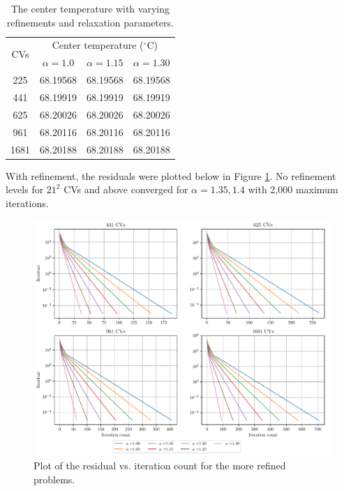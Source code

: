 \documentclass{article}
\begin{document}
\def\arraystretch{1.3}
\begin{table}[H]
	\small
	\centering
	\caption{The center temperature with varying refinements and relaxation parameters.}
	\vspace{0.2cm}
	\begin{tabular}{c|c|c|c}
		\multirow{2}{*}{CVs} & \multicolumn{3}{c}{Center temperature ($^\circ$C)} \\
		\cline{2-4}
		& $\alpha = 1.0$ & $\alpha = 1.15$ & $\alpha = 1.30$ \\     
		\hline
		225  & 68.19568 & 68.19568 & 68.19568 \\
		441  & 68.19919 & 68.19919 & 68.19919 \\
		625  & 68.20026 & 68.20026 & 68.20026 \\
		961  & 68.20116 & 68.20116 & 68.20116 \\
		1681 & 68.20188 & 68.20188 & 68.20188
	\end{tabular}
	\label{table:b-temps}
\end{table}

With refinement, the residuals were plotted below in Figure \ref{fig:b-iterations}. No refinement levels for $21^2$ CVs and above converged for $\alpha = 1.35, 1.4$ with 2,000 maximum iterations.

\begin{figure}[H]
	\centering
	\includegraphics[width=\linewidth]{../results/b-iterations}
	\caption{Plot of the residual vs. iteration count for the more refined problems.}
	\label{fig:b-iterations}
\end{figure}
\end{document}
